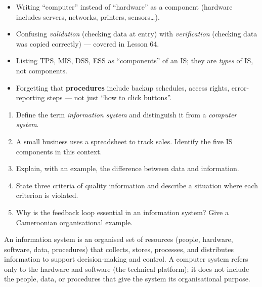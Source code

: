 \documentclass[11pt]{article}
\begin{document}
\begin{attention}
\begin{itemize}
    \item Writing ``computer'' instead of ``hardware'' as a component (hardware includes servers, networks, printers, sensors…).
    \item Confusing \emph{validation} (checking data at entry) with \emph{verification} (checking data was copied correctly) — covered in Lesson 64.
    \item Listing TPS, MIS, DSS, ESS as ``components'' of an IS; they are \emph{types} of IS, not components.
    \item Forgetting that \textbf{procedures} include backup schedules, access rights, error-reporting steps — not just ``how to click buttons''.
\end{itemize}
\end{attention}

\begin{exercice}
\begin{enumerate}
    \item Define the term \emph{information system} and distinguish it from a \emph{computer system}.
    \item A small business uses a spreadsheet to track sales. Identify the five IS components in this context.
    \item Explain, with an example, the difference between data and information.
    \item State three criteria of quality information and describe a situation where each criterion is violated.
    \item Why is the feedback loop essential in an information system? Give a Cameroonian organisational example.
\end{enumerate}
\end{exercice}

\begin{corrige}[Exercise 1]
An information system is an organised set of resources (people, hardware, software, data, procedures) that collects, stores, processes, and distributes information to support decision-making and control. A computer system refers only to the hardware and software (the technical platform); it does not include the people, data, or procedures that give the system its organisational purpose.
\end{corrige}
\end{document}
